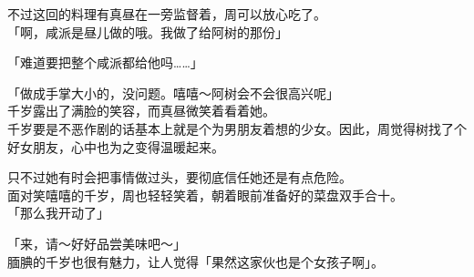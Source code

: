 不过这回的料理有真昼在一旁监督着，周可以放心吃了。\\

「啊，咸派是昼儿做的哦。我做了给阿树的那份」

「难道要把整个咸派都给他吗……」

「做成手掌大小的，没问题。嘻嘻～阿树会不会很高兴呢」\\

千岁露出了满脸的笑容，而真昼微笑着看着她。\\

千岁要是不恶作剧的话基本上就是个为男朋友着想的少女。因此，周觉得树找了个好女朋友，心中也为之变得温暖起来。

只不过她有时会把事情做过头，要彻底信任她还是有点危险。\\

面对笑嘻嘻的千岁，周也轻轻笑着，朝着眼前准备好的菜盘双手合十。\\

「那么我开动了」

「来，请～好好品尝美味吧～」\\

腼腆的千岁也很有魅力，让人觉得「果然这家伙也是个女孩子啊」。
